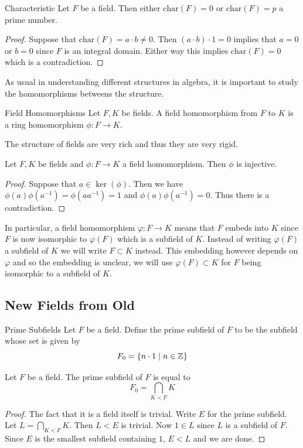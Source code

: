 \documentclass[a4paper]{article}
\begin{document}
\begin{prp}{Characteristic}{} Let $F$ be a field. Then either $\text{char}(F)=0$ or $\text{char}(F)=p$ a prime number. \tcbline
\begin{proof}
Suppose that $\text{char}(F)=a\cdot b\neq 0$. Then $(a\cdot b)\cdot 1=0$ implies that $a=0$ or $b=0$ since $F$ is an integral domain. Either way this implies $\text{char}(F)=0$ which is a contradiction. 
\end{proof}
\end{prp}

As usual in understanding different structures in algebra, it is important to study the homomorphisms betweens the structure. 

\begin{defn}{Field Homomorphisms}{} Let $F,K$ be fields. A field homomorphism from $F$ to $K$ is a ring homomorphism $\phi:F\to K$. 
\end{defn}

The structure of fields are very rich and thus they are very rigid. 

\begin{lmm}{}{} Let $F,K$ be fields and $\phi:F\to K$ a field homomorphism. Then $\phi$ is injective. \tcbline
\begin{proof}
Suppose that $a\in\ker(\phi)$. Then we have $\phi(a)\phi(a^{-1})=\phi(aa^{-1})=1$ and $\phi(a)\phi(a^{-1})=0$. Thus there is a contradiction. 
\end{proof}
\end{lmm}

In particular, a field homomorphism $\varphi:F\to K$ means that $F$ embeds into $K$ since $F$ is now isomorphic to $\varphi(F)$ which is a subfield of $K$. Instead of writing $\varphi(F)$ a subfield of $K$ we will write $F\subset K$ instead. This embedding however depends on $\varphi$ and so the embedding is unclear, we will use $\varphi(F)\subset K$ for $F$ being isomorphic to a subfield of $K$. 

\subsection{New Fields from Old}
\begin{defn}{Prime Subfields}{} Let $F$ be a field. Define the prime subfield of $F$ to be the subfield whose set is given by $$F_0=\{n\cdot 1\;|\;n\in\mathbb{Z}\}$$
\end{defn}

\begin{prp}{}{} Let $F$ be a field. The prime subfield of $F$ is equal to $$F_0=\bigcap_{K<F}K$$ \tcbline
\begin{proof}
The fact that it is a field itself is trivial. Write $E$ for the prime subfield. Let $L=\bigcap_{K<F}K$.  Then $L<E$ is trivial. Now $1\in L$ since $L$ is a subfield of $F$. Since $E$ is the smallest subfield containing $1$, $E<L$ and we are done. 
\end{proof}
\end{prp}
\end{document}
